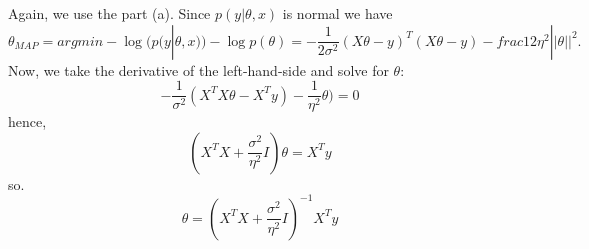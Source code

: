 \begin{answer}
Again, we use the part (a). Since $p(y|\theta, x)$ is normal we have
$$\theta_{MAP} = argmin - \log(p(y|\theta, x)) - \log p(\theta)=
- \frac 1{2\sigma^2} (X\theta - y)^T(X\theta - y) - frac 1{2\eta^2}||\theta||^2.$$
Now, we take the derivative of the left-hand-side and solve for $\theta:$
$$-\frac 1{\sigma^2}(X^TX\theta - X^Ty) - \frac 1{\eta^2}\theta) = 0$$
hence,
$$(X^TX + \frac{\sigma^2}{\eta^2}I)\theta = X^Ty$$
so.
$$\theta = (X^TX + \frac{\sigma^2}{\eta^2}I)^{-1}X^Ty$$
\end{answer}
